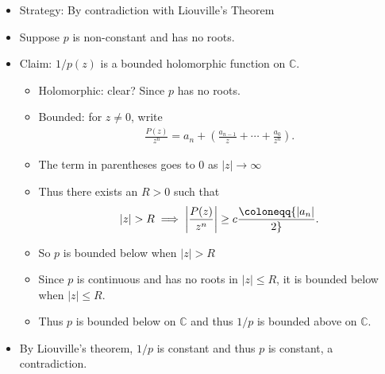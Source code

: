 \begin{solution}

\hfill

\begin{concept}

\hfill

\end{concept}

\begin{itemize}
\tightlist
\item
  Strategy: By contradiction with Liouville's Theorem
\item
  Suppose \(p\) is non-constant and has no roots.
\item
  Claim: \(1/p(z)\) is a bounded holomorphic function on
  \({\mathbb{C}}\).

  \begin{itemize}
  \item
    Holomorphic: clear? Since \(p\) has no roots.
  \item
    Bounded: for \(z\neq 0\), write
    \begin{align*}     \frac{P(z)}{z^{n}}=a_{n}+\left(\frac{a_{n-1}}{z}+\cdots+\frac{a_{0}}{z^{n}}\right)     .\end{align*}
  \item
    The term in parentheses goes to 0 as
    \({\left\lvert {z} \right\rvert}\to \infty\)
  \item
    Thus there exists an \(R>0\) such that
    \begin{align*}     {\left\lvert {z} \right\rvert} > R \implies {\left\lvert {P(z) \over z^n} \right\rvert} \geq c \coloneqq{{\left\lvert {a_n} \right\rvert} \over 2}     .\end{align*}
  \item
    So \(p\) is bounded below when
    \({\left\lvert {z} \right\rvert} > R\)
  \item
    Since \(p\) is continuous and has no roots in
    \({\left\lvert {z} \right\rvert} \leq R\), it is bounded below when
    \({\left\lvert {z} \right\rvert} \leq R\).
  \item
    Thus \(p\) is bounded below on \({\mathbb{C}}\) and thus \(1/p\) is
    bounded above on \({\mathbb{C}}\).
  \end{itemize}
\item
  By Liouville's theorem, \(1/p\) is constant and thus \(p\) is
  constant, a contradiction.
\end{itemize}

\end{solution}


